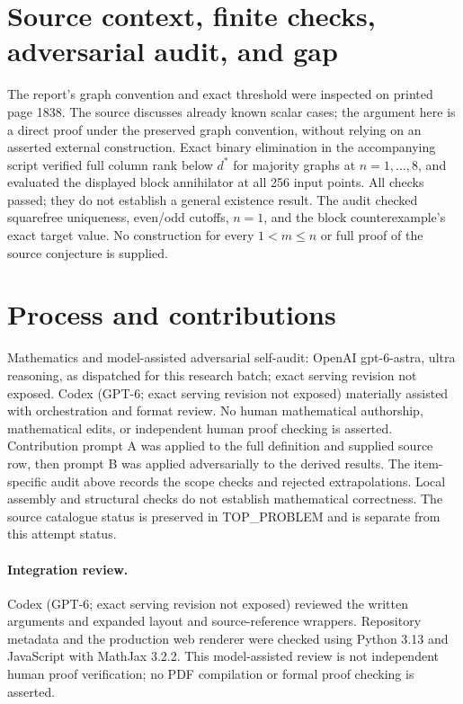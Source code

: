 \documentclass[11pt]{article}
\begin{document}
\section{Source context, finite checks, adversarial audit, and gap}
The report's graph convention and exact threshold were inspected on printed
page 1838. The source discusses already known scalar cases; the argument here
is a direct proof under the preserved graph convention, without relying on
an asserted external construction. Exact binary elimination in the accompanying
script verified full column rank below $d^*$ for majority graphs at
$n=1,\ldots,8$, and evaluated the displayed block annihilator at all 256
input points. All checks passed; they do not establish a general existence
result. The audit checked squarefree uniqueness, even/odd cutoffs, $n=1$,
and the block counterexample's exact target value. No construction for every
$1<m\le n$ or full proof of the source conjecture is supplied.

\section{Process and contributions}
Mathematics and model-assisted adversarial self-audit: OpenAI gpt-6-astra, ultra reasoning, as dispatched for this research batch; exact serving revision not exposed. Codex (GPT-6; exact serving revision not exposed) materially assisted with orchestration and format review. No human mathematical authorship, mathematical edits, or independent human proof checking is asserted.
Contribution prompt A was applied to the full definition and supplied source row, then prompt B was applied adversarially to the derived results. The item-specific audit above records the scope checks and rejected extrapolations. Local assembly and structural checks do not establish mathematical correctness. The source catalogue status is preserved in TOP\_PROBLEM and is separate from this attempt status.
\paragraph{Integration review.} Codex (GPT-6; exact serving revision not exposed) reviewed the written arguments and expanded layout and source-reference wrappers. Repository metadata and the production web renderer were checked using Python 3.13 and JavaScript with MathJax 3.2.2. This model-assisted review is not independent human proof verification; no PDF compilation or formal proof checking is asserted.
\end{document}
